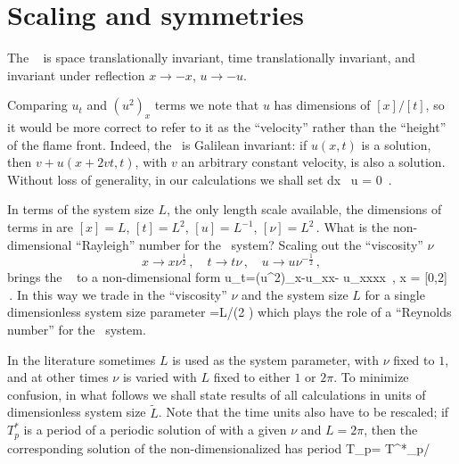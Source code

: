 %

\section{Scaling and symmetries}


The \KSe\  is space translationally invariant,
time translationally invariant, and invariant under
reflection
$x \to -x$, 
$u \to -u$. 

Comparing $u_t$ and $(u^2)_x$ terms we note that $u$ has
dimensions of $[x]/[t]$, so it would be more correct to
refer to it as the ``velocity'' rather than the 
``height'' of the flame front. Indeed, the  \KSe\ is
Galilean invariant: if $u(x,t)$ is a solution, then 
$v+u(x+2vt,t)$, with $v$ an arbitrary constant velocity, is also a solution. 
Without loss of generality, in our calculations we shall set 
\beq
\int dx \, u = 0
\,.

In terms of the system size $L$, the only length scale available,
the dimensions of terms in  are
$ %
[x]=L
$, $%
[t]=L^2
$, $%
[u]=L^{-1}
$, $%
[\nu]=L^2
\,.
$ %
What is the non-dimensional ``Rayleigh'' number for the
\KS\ system? 
 Scaling out the ``viscosity'' $\nu$ 
\[ 
x \to x \nu^{\frac{1}{2}}
\,,\quad
t \to t \nu
\,,\quad
u \to u \nu^{-\frac{1}{2}}
\,,
\]
brings the \KSe\ 
to a non-dimensional form
\beq
u_t=(u^2)_x-u_{xx}- u_{xxxx}
\,,\qquad	
	x \in  [0,L\nu^{-\frac{1}{2}}] = [0,2\pi{}]
\,.
In this way we trade in the ``viscosity'' $\nu$
and the system size $L$ for a single
dimensionless system size parameter
\beq
	={L}/{(2 \pi \sqrt{\nu})}
which plays the role of a ``Reynolds number''
for the \KS\ system.

In the literature sometimes 
$L$ is used as the system parameter, with $\nu$ fixed to $1$, and
at other times $\nu$ is varied with $L$ fixed to either $1$ or $2\pi$.
To minimize confusion,
in what follows we shall state results of all 
calculations in units of dimensionless system size $\tilde{L}$.
Note that the time units also have to be
rescaled; if $T^*_p$ is a period
of a periodic solution of  with a given
$\nu$ and $L=2\pi$, then
the corresponding solution of the non-dimensionalized 
has period 
\beq
 T_p= T^*_p/\nu
{}

